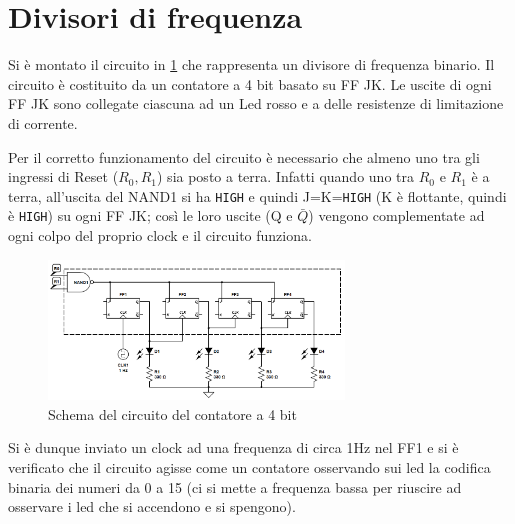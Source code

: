 \documentclass[a4paper,10pt]{article}
\def\code#1{\texttt{#1}}
\begin{document}






\section{Divisori di frequenza}
Si è montato il circuito in \cref{fig:counter} che rappresenta un divisore di frequenza binario.
Il circuito è costituito da un contatore a 4 bit basato su FF JK. Le uscite di ogni FF JK sono collegate
ciascuna ad un Led rosso e a delle resistenze di limitazione di corrente.
\newline

Per il corretto funzionamento del circuito è necessario che almeno uno tra gli ingressi di Reset ($R_0 , R_1$)
sia posto a terra. Infatti quando uno tra $R_0$ e $R_1$ è a terra, all'uscita del NAND1 si ha \code{HIGH} e quindi J=K=\code{HIGH} (K è flottante, quindi è \code{HIGH}) su ogni FF JK; così le loro uscite (Q e $\bar{Q}$) vengono complementate ad ogni colpo del proprio clock e il circuito funziona.

\begin{figure}[H]
	\centering
	\includegraphics[width=0.7\textwidth]{../grafici/counterScheme.png}
	\caption{Schema del circuito del contatore a 4 bit}
	\label{fig:counter}
\end{figure}

Si è dunque inviato un clock ad una frequenza di circa 1Hz nel FF1 e si è verificato
che il circuito agisse come un contatore osservando sui led la codifica binaria dei numeri da 0 a 15 (ci si mette a frequenza bassa per riuscire ad osservare i led che si accendono e si spengono).
\end{document}
